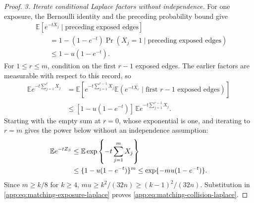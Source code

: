 \begin{proof}
\emph{3. Iterate conditional Laplace factors without independence.}
For one exposure, the Bernoulli identity and the preceding probability
bound give
\begin{align*}
 &\mathbb E[e^{-tX_j}\mid\text{preceding exposed edges}]\\
 &\qquad=1-(1-e^{-t})\Pr(X_j=1\mid\text{preceding exposed edges})\\
 &\qquad\le1-u(1-e^{-t}).
\end{align*}
For \(1\le r\le m\), condition on the first \(r-1\) exposed edges.
The earlier factors are measurable with respect to this record, so
\begin{align*}
 \mathbb E e^{-t\sum_{j=1}^{r}X_j}
 &=\mathbb E\!\left[
   e^{-t\sum_{j=1}^{r-1}X_j}
   \mathbb E(e^{-tX_r}\mid\text{first \(r-1\) exposed edges})\right]\\
 &\le[1-u(1-e^{-t})]\,
      \mathbb E e^{-t\sum_{j=1}^{r-1}X_j}.
\end{align*}
Starting with the empty sum at \(r=0\), whose exponential is one, and
iterating to \(r=m\) gives the power below without an independence
assumption:
\begin{align}
 \mathbb E e^{-tZ_{S}}
 &\le \mathbb E\exp\left\{-t\sum_{j=1}^mX_j\right\}\notag\\
 &\le\{1-u(1-e^{-t})\}^{m}
 \le\exp\{-mu(1-e^{-t})\}.
 \label{app:eq:matching-exposure-laplace}
\end{align}
Since \(m\ge k/8\) for \(k\ge4\),
\(mu\ge k^2/(32n)\ge(k-1)^2/(32n)\). Substitution in
\eqref{app:eq:matching-exposure-laplace} proves
\eqref{app:eq:matching-collision-laplace}.
\end{proof}
